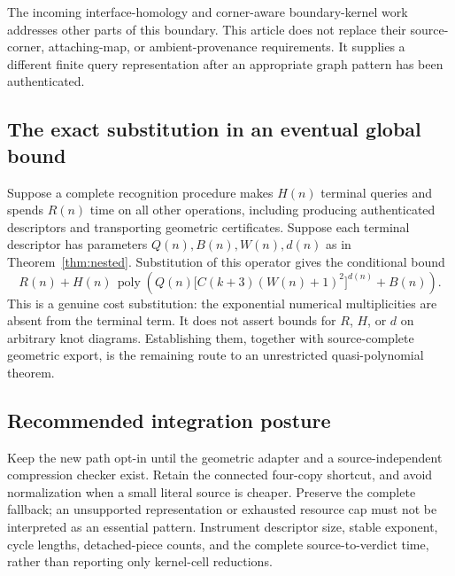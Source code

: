 \documentclass[11pt]{article}
\theoremstyle{remark}\newtheorem{remark}[theorem]{Remark}
\newcommand{\poly}{\operatorname{poly}}
\begin{document}
The incoming interface-homology and corner-aware boundary-kernel work addresses other parts of this boundary. This article does not replace their source-corner, attaching-map, or ambient-provenance requirements. It supplies a different finite query representation after an appropriate graph pattern has been authenticated.

\subsection{The exact substitution in an eventual global bound}
Suppose a complete recognition procedure makes $H(n)$ terminal queries and spends $R(n)$ time on all other operations, including producing authenticated descriptors and transporting geometric certificates. Suppose each terminal descriptor has parameters $Q(n),B(n),W(n),d(n)$ as in Theorem~\ref{thm:nested}. Substitution of this operator gives the conditional bound
\[
 R(n)+H(n)\,\poly\!\left(Q(n)\bigl[C(k+3)(W(n)+1)^2\bigr]^{d(n)}+B(n)\right).
\]
This is a genuine cost substitution: the exponential numerical multiplicities are absent from the terminal term. It does not assert bounds for $R$, $H$, or $d$ on arbitrary knot diagrams. Establishing them, together with source-complete geometric export, is the remaining route to an unrestricted quasi-polynomial theorem.

\subsection{Recommended integration posture}
Keep the new path opt-in until the geometric adapter and a source-independent compression checker exist. Retain the connected four-copy shortcut, and avoid normalization when a small literal source is cheaper. Preserve the complete fallback; an unsupported representation or exhausted resource cap must not be interpreted as an essential pattern. Instrument descriptor size, stable exponent, cycle lengths, detached-piece counts, and the complete source-to-verdict time, rather than reporting only kernel-cell reductions.
\end{document}
